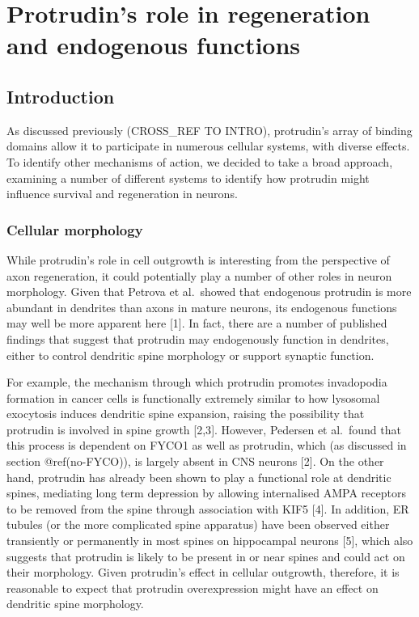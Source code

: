 \documentclass[
  12pt,
  a4paper,
]{article}
\author{}
\date{\vspace{-2.5em}}
\begin{document}
\hypertarget{protrudins-role-in-regeneration-and-endogenous-functions}{%
\section{Protrudin's role in regeneration and endogenous
functions}\label{protrudins-role-in-regeneration-and-endogenous-functions}}

\hypertarget{introduction}{%
\subsection{Introduction}\label{introduction}}

As discussed previously (CROSS\_REF TO INTRO), protrudin's array of
binding domains allow it to participate in numerous cellular systems,
with diverse effects. To identify other mechanisms of action, we decided
to take a broad approach, examining a number of different systems to
identify how protrudin might influence survival and regeneration in
neurons.

\hypertarget{cellular-morphology}{%
\subsubsection{Cellular morphology}\label{cellular-morphology}}

While protrudin's role in cell outgrowth is interesting from the
perspective of axon regeneration, it could potentially play a number of
other roles in neuron morphology. Given that Petrova et al.~showed that
endogenous protrudin is more abundant in dendrites than axons in mature
neurons, its endogenous functions may well be more apparent here
{[}1{]}. In fact, there are a number of published findings that suggest
that protrudin may endogenously function in dendrites, either to control
dendritic spine morphology or support synaptic function.

For example, the mechanism through which protrudin promotes invadopodia
formation in cancer cells is functionally extremely similar to how
lysosomal exocytosis induces dendritic spine expansion, raising the
possibility that protrudin is involved in spine growth {[}2,3{]}.
However, Pedersen et al.~found that this process is dependent on FYCO1
as well as protrudin, which (as discussed in section @ref(no-FYCO)), is
largely absent in CNS neurons {[}2{]}. On the other hand, protrudin has
already been shown to play a functional role at dendritic spines,
mediating long term depression by allowing internalised AMPA receptors
to be removed from the spine through association with KIF5 {[}4{]}. In
addition, ER tubules (or the more complicated spine apparatus) have been
observed either transiently or permanently in most spines on hippocampal
neurons {[}5{]}, which also suggests that protrudin is likely to be
present in or near spines and could act on their morphology. Given
protrudin's effect in cellular outgrowth, therefore, it is reasonable to
expect that protrudin overexpression might have an effect on dendritic
spine morphology.
\end{document}
